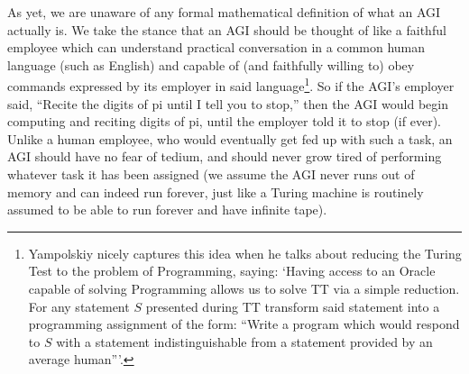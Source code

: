 \documentclass{article}
\begin{document}
As yet, we are unaware of any formal mathematical definition of what an AGI
actually is. We take the stance that an AGI should be thought of like a faithful
employee which can understand
practical conversation in a common human language (such as
English) and capable of (and faithfully willing to) obey commands
expressed by its employer in said language\footnote{Yampolskiy \cite{yampolskiy2013turing}
nicely captures this idea when he talks about reducing the Turing Test to the
problem of Programming, saying: `Having access to an Oracle capable of solving Programming
allows us to solve TT via a simple reduction. For any statement $S$ presented during
TT transform said statement into a programming assignment of the form: ``Write a
program which would respond to $S$ with a statement indistinguishable from a statement
provided by an average human{''}'.}.
So if the AGI's employer said, ``Recite the digits of pi until I tell you to
stop,'' then the AGI would begin computing and reciting digits of pi, until the
employer told it to stop (if ever). Unlike a human employee, who would eventually
get fed up with such a task, an AGI should have no fear of tedium, and should
never grow tired of performing whatever task it has been assigned (we assume
the AGI never runs out of memory and can indeed run forever, just like a Turing
machine is routinely assumed to be able to run forever and have infinite tape).
\end{document}
